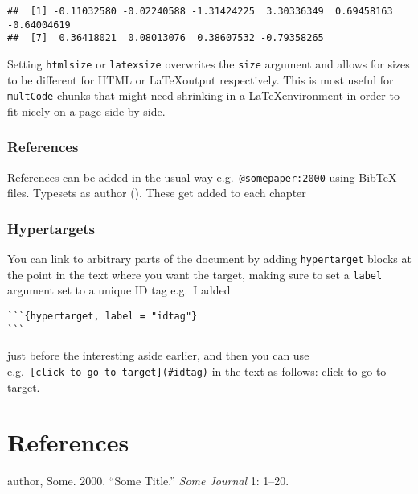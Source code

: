 \documentclass[
]{book}
\newlength{\cslhangindent}
\newenvironment{CSLReferences}[2] %
 {\begin{list}{}{%
  \setlength{\itemindent}{0pt}
  \setlength{\leftmargin}{0pt}
  \setlength{\parsep}{0pt}
  \ifodd #1
   \setlength{\leftmargin}{\cslhangindent}
   \setlength{\itemindent}{-1\cslhangindent}
  \fi
  \setlength{\itemsep}{#2\baselineskip}}}
 {\end{list}}
\begin{document}
\begin{verbatim}
##  [1] -0.11032580 -0.02240588 -1.31424225  3.30336349  0.69458163 -0.64004619
##  [7]  0.36418021  0.08013076  0.38607532 -0.79358265
\end{verbatim}

\normalsize

Setting \texttt{htmlsize} or \texttt{latexsize} overwrites the \texttt{size} argument and allows for sizes to be different for HTML or \LaTeX output respectively. This is most useful for \texttt{multCode} chunks that might need shrinking in a \LaTeX environment in order to fit nicely on a page side-by-side.

\subsection{References}\label{references}

References can be added in the usual way e.g.~\texttt{@somepaper:2000} using BibTeX files. Typesets as author (). These get added to each chapter

\subsection{Hypertargets}\label{hypertargets}

You can link to arbitrary parts of the document by adding \texttt{hypertarget} blocks at the point in the text where you want the target, making sure to set a \texttt{label} argument set to a unique ID tag e.g.~I added

\begin{verbatim}
```{hypertarget, label = "idtag"}
```
\end{verbatim}

just before the interesting aside earlier, and then you can use e.g.~\texttt{{[}click\ to\ go\ to\ target{]}(\#idtag)} in the text as follows: \hyperref[idtag]{click to go to target}.

\chapter*{References}\label{references-1}

\label{refs}
\begin{CSLReferences}{1}{0}
author, Some. 2000. {``Some Title.''} \emph{Some Journal} 1: 1--20.

\end{CSLReferences}
\end{document}
